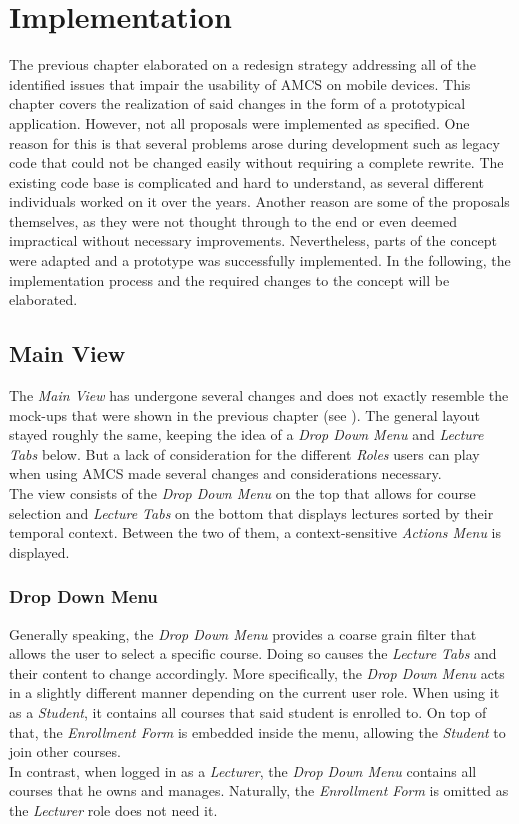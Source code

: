 \chapter{Implementation}
\label{chapter:implementation}

The previous chapter elaborated on a redesign strategy addressing all of the identified issues that impair the usability of AMCS on mobile devices.
This chapter covers the realization of said changes in the form of a prototypical application. However, not all proposals were implemented as specified. One reason for this is that several problems arose during development such as legacy code that could not be changed easily without requiring a complete rewrite. The existing code base is complicated and hard to understand, as several different individuals worked on it over the years. Another reason are some of the proposals themselves, as they were not thought through to the end or even deemed impractical without necessary improvements. Nevertheless, parts of the concept were adapted and a prototype was successfully implemented.
In the following, the implementation process and the required changes to the concept will be elaborated.

\section{Main View}

The \emph{Main View} has undergone several changes and does not exactly resemble the mock-ups that were shown in the previous chapter (see ). The general layout stayed roughly the same, keeping the idea of a \emph{Drop Down Menu} and \emph{Lecture Tabs} below. But a lack of consideration for the different \emph{Roles} users can play when using AMCS made several changes and considerations necessary.
\\
The view consists of the \emph{Drop Down Menu} on the top that allows for course selection and \emph{Lecture Tabs} on the bottom that displays lectures sorted by their temporal context. Between the two of them, a context-sensitive \emph{Actions Menu} is displayed.

\subsection{Drop Down Menu}
Generally speaking, the \emph{Drop Down Menu} provides a coarse grain filter that allows the user to select a specific course. Doing so causes the \emph{Lecture Tabs} and their content to change accordingly.
\todogrf
More specifically, the \emph{Drop Down Menu} acts in a slightly different manner depending on the current user role. When using it as a \emph{Student}, it contains all courses that said student is enrolled to. On top of that, the \emph{Enrollment Form} is embedded inside the menu, allowing the \emph{Student} to join other courses.
\\
In contrast, when logged in as a \emph{Lecturer}, the \emph{Drop Down Menu} contains all courses that he owns and manages. Naturally, the \emph{Enrollment Form} is omitted as the \emph{Lecturer} role does not need it.

